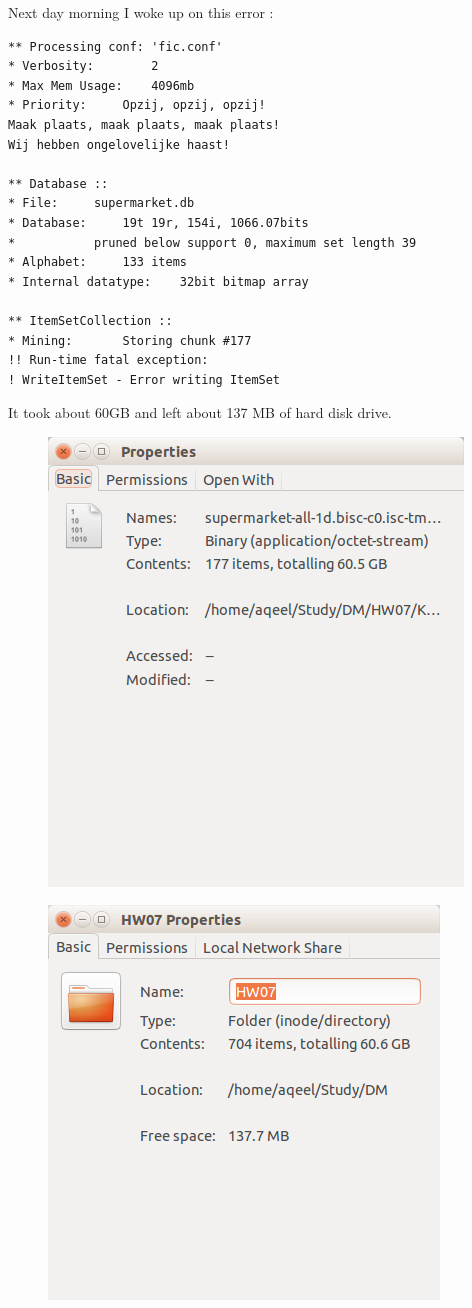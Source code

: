 \documentclass{article}
\begin{document}
Next day morning I woke up on this error :
\begin{lstlisting}
** Processing conf: 'fic.conf'
* Verbosity:		2
* Max Mem Usage:	4096mb
* Priority:		Opzij, opzij, opzij!
Maak plaats, maak plaats, maak plaats!
Wij hebben ongelovelijke haast!

** Database :: 
* File:		supermarket.db
* Database:		19t 19r, 154i, 1066.07bits
* 			pruned below support 0, maximum set length 39
* Alphabet:		133 items
* Internal datatype:	32bit bitmap array

** ItemSetCollection ::
* Mining:		Storing chunk #177             
!! Run-time fatal exception:
! WriteItemSet - Error writing ItemSet
\end{lstlisting}
It took about 60GB and left about 137 MB of hard disk drive.
\begin{figure}[H]
\includegraphics[scale=1]{size.png}
\end{figure}
\begin{figure}[H]
	\includegraphics[scale=1]{space.png}
\end{figure}
\end{document}
